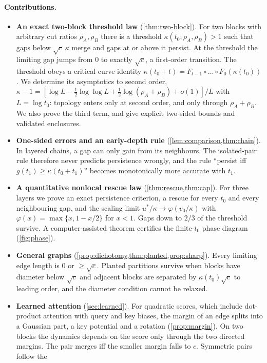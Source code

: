 \documentclass[10pt]{article}
\theoremstyle{definition}
\theoremstyle{remark}
\begin{document}
\paragraph{Contributions.}
\begin{itemize}[leftmargin=1.3em,itemsep=2pt]
\item \textbf{An exact two-block threshold law} (\cref{thm:two-block}). For two blocks with arbitrary cut ratios
$\rho_A,\rho_B$ there is a threshold $\kappa(t_0;\rho_A,\rho_B)>1$ such that gaps below $\sqrt c\,\kappa$ merge and gaps at or
above it persist. At the threshold the limiting gap jumps from $0$ to exactly $\sqrt c$, a first-order transition. The
threshold obeys a critical-curve identity $\kappa(t_0+t)=F_{t-1}\circ\dots\circ F_0(\kappa(t_0))$. We determine its
asymptotics to second order, $\kappa-1=[\log L-\frac12\log\log L+\frac12\log(\rho_A+\rho_B)+o(1)]/L$ with $L=\log t_0$:
topology enters only at second order, and only through $\rho_A+\rho_B$. We also prove the third term, and give explicit two-sided
bounds and validated enclosures.
\item \textbf{One-sided errors and an early-depth rule} (\cref{lem:comparison,thm:chain}). In layered chains, a gap can
only gain from its neighbours. The isolated-pair rule therefore never predicts persistence wrongly, and the rule ``persist iff
$g(t_1)\ge\kappa(t_0+t_1)$'' becomes monotonically more accurate with $t_1$.
\item \textbf{A quantitative nonlocal rescue law} (\cref{thm:rescue,thm:cap}). For three layers we prove an exact
persistence criterion, a rescue for every $t_0$ and every neighbouring gap, and the scaling limit
$u^*/\kappa\to\varphi(v_0/\kappa)$ with $\varphi(x)=\max\{x,1-x/2\}$ for $x<1$. Gaps down to $2/3$ of the threshold survive. A
computer-assisted theorem certifies the finite-$t_0$ phase diagram (\cref{fig:phase}).
\item \textbf{General graphs} (\cref{prop:dichotomy,thm:planted,prop:sharp}). Every limiting edge length is $0$ or
$\ge\sqrt c$. Planted partitions survive when blocks have diameter below $\sqrt c$ and adjacent blocks are separated by
$\kappa(t_0)\sqrt c$ to leading order, and the diameter condition cannot be relaxed.
\item \textbf{Learned attention} (\cref{sec:learned}). For quadratic scores, which include dot-product attention with query and key
biases, the margin of an edge splits into a Gaussian part, a key potential and a rotation (\cref{prop:margin}). On two blocks the dynamics
depends on the score only through the two directed margins. The pair merges iff the smaller margin falls to $c$. Symmetric pairs follow the

\end{itemize}
\end{document}
